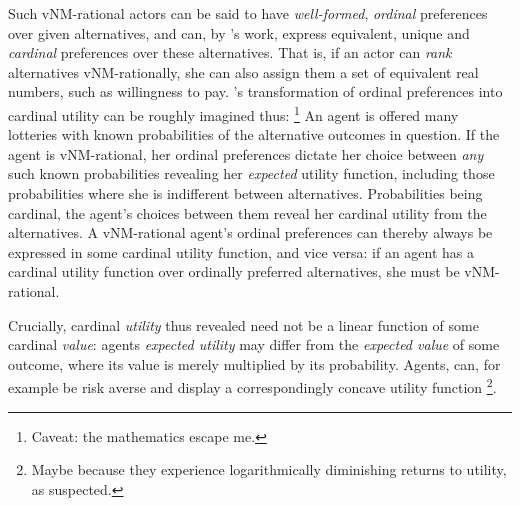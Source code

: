 Such \gls{vNM}-rational actors can be said to have \emph{well-formed}, \emph{ordinal} preferences over given alternatives, and can, by \citeauthor{VonNeumannMorgenstern1944}'s work, express equivalent, unique and \emph{cardinal} preferences over these alternatives. 
That is, if an actor can \emph{rank} alternatives \gls{vNM}-rationally, she can also assign them a set of equivalent real numbers, such as willingness to pay. 
\citeauthor{VonNeumannMorgenstern1944}'s transformation of ordinal preferences into cardinal utility can be roughly imagined thus:
\footnote{
	Caveat: the mathematics escape me.
}
An agent is offered many lotteries with known probabilities of the alternative outcomes in question. 
If the agent is \gls{vNM}-rational, her ordinal preferences dictate her choice between \emph{any} such known probabilities revealing her \emph{expected} utility function, including those probabilities where she is indifferent between alternatives. %
Probabilities being cardinal, the agent's choices between them reveal her cardinal utility from the alternatives. A \gls{vNM}-rational agent's ordinal preferences can thereby always be expressed in some cardinal utility function, and vice versa: if an agent has a cardinal utility function over ordinally preferred alternatives, she must be \gls{vNM}-rational.

Crucially, cardinal \emph{utility} thus revealed need not be a linear function of some cardinal \emph{value}: agents \emph{expected utility} may differ from the \emph{expected value} of some outcome, where its value is merely multiplied by its probability. 
Agents, can, for example be risk averse and display a correspondingly concave utility function
\footnote{
	Maybe because they experience logarithmically diminishing returns to utility, as \cite{Bernoulli1738} suspected.
}. 

